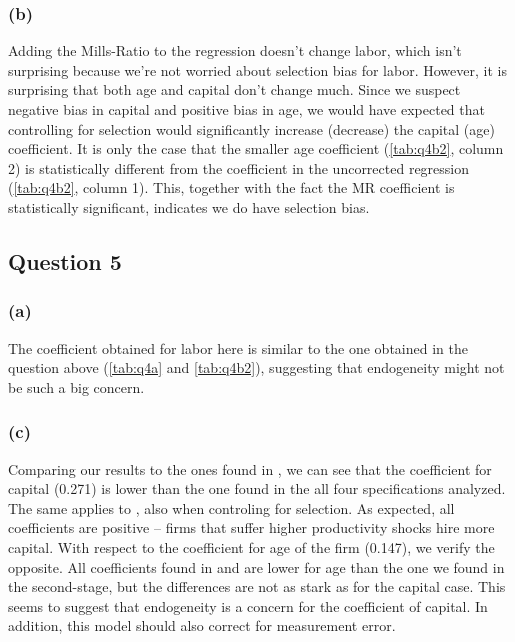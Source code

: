 \documentclass[11pt]{article}
\begin{document}

\FloatBarrier

\subsubsection*{(b)} Adding the Mills-Ratio to the regression doesn't change labor, which isn't surprising because we're not worried about selection bias for labor. However, it is surprising that both age and capital don't change much. Since we suspect negative bias in capital and positive bias in age, we would have expected that controlling for selection would significantly increase (decrease) the capital (age) coefficient. It is only the case that the smaller age coefficient (\autoref{tab:q4b2}, column 2) is statistically different from the coefficient in the uncorrected regression (\autoref{tab:q4b2}, column 1). This, together with the fact the MR coefficient is statistically significant, indicates we do have selection bias.





\FloatBarrier

\subsection*{Question 5} \label{q5}
\subsubsection*{(a)}
The coefficient obtained for labor here is similar to the one obtained in the question above (\autoref{tab:q4a} and \autoref{tab:q4b2}), suggesting that endogeneity might not be such a big concern. 


\FloatBarrier


\subsubsection*{(c)}


\FloatBarrier

\FloatBarrier
Comparing our results to the ones found in , we can see that the coefficient for capital (0.271) is lower than the one found in the all four specifications analyzed. The same applies to , also when controling for selection. As expected, all coefficients are positive -- firms that suffer higher productivity shocks hire more capital. 
With respect to the coefficient for age of the firm (0.147), we verify the opposite. All coefficients found in  and  are lower for age than the one we found in the second-stage, but the differences are not as stark as for the capital case. 
This seems to suggest that endogeneity is a concern for the coefficient of capital. In addition, this model should also correct for measurement error.  
\newpage
\end{document}
